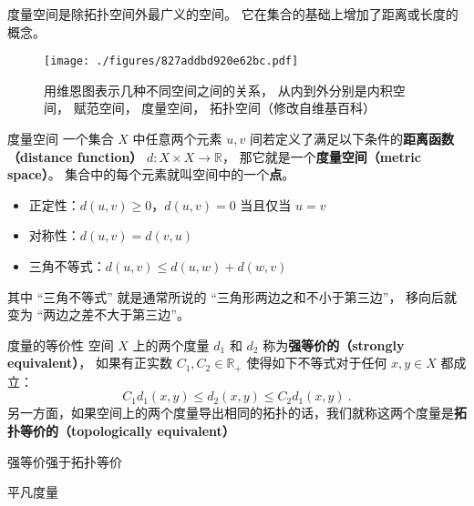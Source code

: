 

度量空间是除拓扑空间外最广义的空间。 它在集合的基础上增加了距离或长度的概念。
\begin{figure}[ht]
\centering
\texttt{[image: ./figures/827addbd920e62bc.pdf]}
\caption{用维恩图表示几种不同空间之间的关系， 从内到外分别是内积空间， 赋范空间， 度量空间， 拓扑空间（修改自维基百科）} \label{fig_Metric_2}
\end{figure}

\begin{definition}{度量空间}\label{def_Metric_2}
一个集合 $X$ 中任意两个元素 $u, v$ 间若定义了满足以下条件的\textbf{距离函数（distance function）} $d: X \times X \to \mathbb{R}$， 那它就是一个\textbf{度量空间（metric space）}。 集合中的每个元素就叫空间中的一个\textbf{点}。
\begin{itemize}
\item 正定性：$d(u, v) \geq 0$，$d(u, v)=0$ 当且仅当 $u=v$
\item 对称性：$d(u, v) = d(v, u)$
\item 三角不等式：$d(u, v) \leqslant d(u, w) + d(w, v)$
\end{itemize}
\end{definition}
\addTODO{距离有$[0, +\infty)$和$[0, \infty]$两种定义，在拓扑等价的意义下可以互相转换。}

其中 “三角不等式” 就是通常所说的 “三角形两边之和不小于第三边”， 移向后就变为 “两边之差不大于第三边”。

\begin{definition}{度量的等价性}
空间 $X$ 上的两个度量 $d_1$ 和 $d_2$ 称为\textbf{强等价的（strongly equivalent）}， 如果有正实数 $C_1, C_2 \in \mathbb{R}_+$ 使得如下不等式对于任何 $x, y \in X$ 都成立：
$$
C_1 d_1(x, y) \leq d_2(x, y) \leq C_2 d_1(x, y)~.
$$
另一方面，如果空间上的两个度量导出相同的拓扑的话，我们就称这两个度量是\textbf{拓扑等价的（topologically equivalent）}
\end{definition}

\begin{theorem}{强等价强于拓扑等价}

\end{theorem}


\begin{example}{平凡度量}
\end{example}


